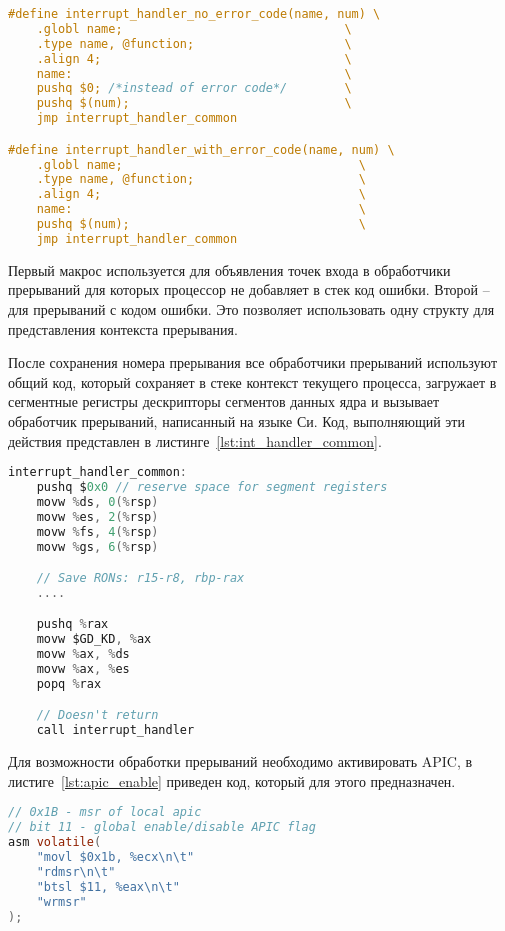 \begin{lstlisting}[language=C,
caption={Макросы для объявления точек входа в обработчики прерываний},
label={lst:declare_interrupt_handler_entry}]
#define interrupt_handler_no_error_code(name, num) \
	.globl name;                               \
	.type name, @function;                     \
	.align 4;                                  \
	name:                                      \
	pushq $0; /*instead of error code*/        \
	pushq $(num);                              \
	jmp interrupt_handler_common

#define interrupt_handler_with_error_code(name, num) \
	.globl name;                                 \
	.type name, @function;                       \
	.align 4;                                    \
	name:                                        \
	pushq $(num);                                \
	jmp interrupt_handler_common
\end{lstlisting}

Первый макрос используется для объявления точек входа в обработчики прерываний для
которых процессор не добавляет в стек код ошибки. Второй -- для прерываний с кодом
ошибки. Это позволяет использовать одну структу для представления контекста прерывания.

После сохранения номера прерывания все обработчики прерываний используют общий код,
который сохраняет в стеке контекст текущего процесса, загружает в сегментные регистры
дескрипторы сегментов данных ядра и вызывает обработчик прерываний, написанный на
языке Си. Код, выполняющий эти действия представлен в листинге~\ref{lst:int_handler_common}.

\begin{lstlisting}[language=C,
caption={Общий код обработчиков прерываний},
label={lst:int_handler_common}]
interrupt_handler_common:
	pushq $0x0 // reserve space for segment registers
	movw %ds, 0(%rsp)
	movw %es, 2(%rsp)
	movw %fs, 4(%rsp)
	movw %gs, 6(%rsp)

	// Save RONs: r15-r8, rbp-rax
	....

	pushq %rax
	movw $GD_KD, %ax
	movw %ax, %ds
	movw %ax, %es
	popq %rax

	// Doesn't return
	call interrupt_handler
\end{lstlisting}

Для возможности обработки прерываний необходимо активировать APIC,
в листиге~\ref{lst:apic_enable} приведен код, который для этого предназначен.
\begin{lstlisting}[language=C,
caption={Активация локального APIC},
label={lst:apic_enable}]
// 0x1B - msr of local apic
// bit 11 - global enable/disable APIC flag
asm volatile(
	"movl $0x1b, %ecx\n\t"
	"rdmsr\n\t"
	"btsl $11, %eax\n\t"
	"wrmsr"
);
\end{lstlisting}

